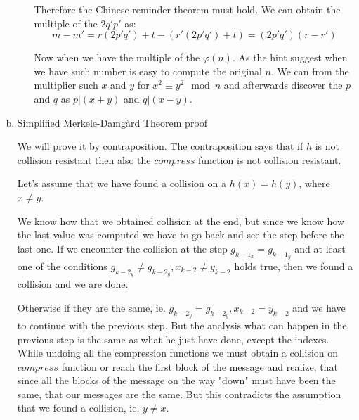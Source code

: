 \documentclass[a4paper,10pt]{article}
\begin{document}
\begin{enumerate}[a)]
\begin{enumerate}[I.]
Therefore the Chinese reminder theorem must hold. We can obtain the multiple of the $2q'p'$ as:
$$
m-m' = r(2p'q') + t - (r'(2p'q') + t) = (2p'q')(r-r')
$$

Now when we have the multiple of the $\varphi(n)$. As the hint suggest when we have such number is easy to compute the original $n$. We can from the multiplier such $x$ and $y$ for $x^2 \equiv y^2 \mod n$ and afterwards discover the $p$ and $q$ as $p|(x+y)$ and $q|(x-y)$.
\end{enumerate}
\newpage

\item Simplified Merkele-Damgård Theorem proof
	
We will prove it by contraposition. The contraposition says that if $h$ is not collision resistant then also the $compress$ function is not collision resistant. 

Let's assume that we have found a collision on a $h(x)=h(y)$, where $x\neq y$.

We know how that we obtained collision at the end, but since we know how the last value was computed we have to go back and see the step before the last one. If we encounter the collision at the step $g_{{k-1}_x}= g_{{k-1}_y}$ and at least one of the conditions $g_{{k-2}_y}\neq g_{{k-2}_y}, x_{k-2}\neq y_{k-2}$ holds true, then we found a collision and we are done.

Otherwise if they are the same, ie. $g_{{k-2}_y}= g_{{k-2}_y}, x_{k-2} = y_{k-2} $ and we have to continue with the previous step. But the analysis what can happen in the previous step is the same as what he just have done, except the indexes. While undoing all the compression functions we must obtain a collision on $compress$ function or reach the first block of the message and realize, that since all the blocks of the message on the way "down" must have been the same, that our messages are the same. But this contradicts the assumption that we found a collision, ie. $y\neq x$.
\end{enumerate}
\end{document}
